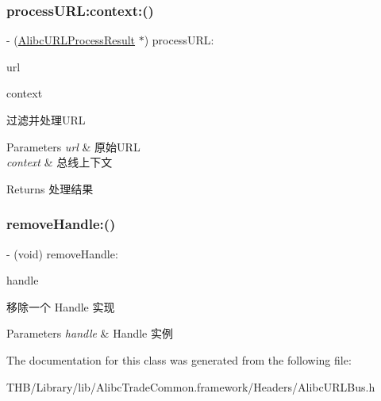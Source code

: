 \subsubsection{\texorpdfstring{process\+U\+R\+L\+:context\+:()}{processURL:context:()}}
{\footnotesize\ttfamily -\/ (\mbox{\hyperlink{interface_alibc_u_r_l_process_result}{Alibc\+U\+R\+L\+Process\+Result}} $\ast$) process\+U\+R\+L\+: \begin{DoxyParamCaption}\item[{(N\+S\+U\+RL $\ast$)}]{url }\item[{context:(\mbox{\hyperlink{interface_alibc_u_r_l_bus_context}{Alibc\+U\+R\+L\+Bus\+Context}} $\ast$)}]{context }\end{DoxyParamCaption}}

过滤并处理\+U\+RL 
\begin{DoxyParams}{Parameters}
{\em url} & 原始\+U\+RL \\
\hline
{\em context} & 总线上下文 \\
\hline
\end{DoxyParams}
\begin{DoxyReturn}{Returns}
处理结果 
\end{DoxyReturn}
\mbox{\label{interface_alibc_u_r_l_bus_af4a35e8c5e4fbcef5b08ecd19620ac27}} 
\subsubsection{\texorpdfstring{remove\+Handle\+:()}{removeHandle:()}}
{\footnotesize\ttfamily -\/ (void) remove\+Handle\+: \begin{DoxyParamCaption}\item[{(id$<$ Alibc\+U\+R\+L\+Bus\+Handle $>$)}]{handle }\end{DoxyParamCaption}}

移除一个 Handle 实现


\begin{DoxyParams}{Parameters}
{\em handle} & Handle 实例 \\
\hline
\end{DoxyParams}


The documentation for this class was generated from the following file\+:\begin{DoxyCompactItemize}
\item 
T\+H\+B/\+Library/lib/\+Alibc\+Trade\+Common.\+framework/\+Headers/Alibc\+U\+R\+L\+Bus.\+h\end{DoxyCompactItemize}
